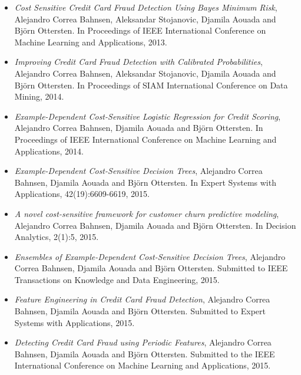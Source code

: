 \begin{itemize}
\item \citep{CorreaBahnsen2013} \textit{Cost Sensitive Credit Card Fraud Detection Using Bayes 
Minimum Risk}, Alejandro Correa Bahnsen,  Aleksandar Stojanovic, Djamila Aouada and Bj\"orn 
Ottersten. In Proceedings of IEEE International Conference on Machine Learning and Applications, 
2013.

\item \citep{CorreaBahnsen2014} \textit{Improving Credit Card Fraud Detection with Calibrated 
Probabilities}, Alejandro Correa Bahnsen, Aleksandar Stojanovic, Djamila Aouada and Bj\"orn 
Ottersten. In Proceedings of SIAM International Conference on Data Mining, 2014.

\item \citep{CorreaBahnsen2014b} \textit{Example-Dependent Cost-Sensitive Logistic Regression for 
Credit Scoring}, Alejandro Correa Bahnsen, Djamila Aouada and Bj\"orn Ottersten.
In Proceedings of IEEE International Conference on Machine Learning and Applications, 2014.

\item \citep{CorreaBahnsen2015} \textit{Example-Dependent Cost-Sensitive Decision Trees},
Alejandro Correa Bahnsen, Djamila Aouada and Bj\"orn Ottersten.
In Expert Systems with Applications, 42(19):6609-6619, 2015.

\item \citep{CorreaBahnsen2015a} \textit{A novel cost-sensitive framework for customer churn 
predictive modeling}, Alejandro Correa Bahnsen, Djamila Aouada and Bj\"orn Ottersten.
In Decision Analytics, 2(1):5, 2015.

\item \citep{CorreaBahnsen2015b} \textit{Ensembles of Example-Dependent Cost-Sensitive Decision 
Trees}, Alejandro Correa Bahnsen, Djamila Aouada and Bj\"orn Ottersten.
Submitted to IEEE Transactions on Knowledge and Data Engineering, 2015.

\item \citep{CorreaBahnsen2015c} \textit{Feature Engineering in Credit Card Fraud Detection},
Alejandro Correa Bahnsen, Djamila Aouada and Bj\"orn Ottersten. Submitted to Expert Systems with 
Applications, 2015.

\item \citep{CorreaBahnsen2015d} \textit{Detecting Credit Card Fraud using Periodic Features}, 
Alejandro Correa Bahnsen, Djamila Aouada and Bj\"orn Ottersten.
Submitted to the IEEE International Conference on Machine Learning and Applications, 2015.


\end{itemize}

